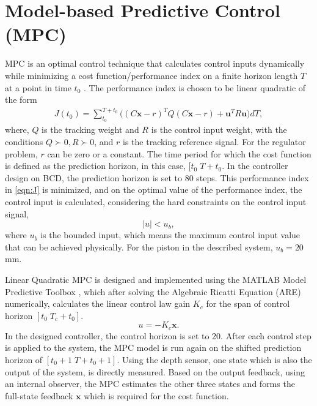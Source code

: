 \documentclass[conference, letterpaper]{IEEEtran}
\begin{document}
\section{Model-based Predictive Control (MPC)}
MPC is an optimal control technique that calculates control inputs dynamically while minimizing a cost function/performance index on a finite horizon length $T$ at a point in time $t_0$ \cite{Rawlings}. The performance index is chosen to be linear quadratic of the form
\begin{equation}
    \begin{aligned}
        J(t_0)= \sum_{t_0}^{T+t_0}{{((C\mathbf{x}-r)}^TQ(C\mathbf{x}-r)+\mathbf{u}^TR\mathbf{u})dT},
    \end{aligned}
    \label{eqn:J}
\end{equation}
where, $Q$ is the tracking weight and $R$ is the control input weight, with the conditions  $ Q\succ0, R\succ0$, and $r$ is the tracking reference signal. For the regulator problem, $r$ can be zero or a constant. The time period for which the cost function is defined as the prediction horizon, in this case, $[t_0 \; T+t_0$. In the controller design on BCD, the prediction horizon is set to 80 steps. This performance index in \ref{eqn:J} is minimized, and on the optimal value of the performance index, the control input is calculated, considering the hard constraints on the control input signal,
\begin{equation}
    |u| < u_b,
\end{equation}
where $u_b$ is the bounded input, which means the maximum control input value that can be achieved physically. For the piston in the described system, $u_b = 20$ mm.

Linear Quadratic MPC is designed and implemented using the MATLAB Model Predictive Toolbox \cite{mathworks_MPC}, which after solving the Algebraic Ricatti Equation (ARE) numerically, calculates the linear control law gain $K_c$ for the span of control horizon $[t_0 \; T_c+t_0]$.
\begin{equation}
    u=-K_c\mathbf{x}.
\end{equation}
In the designed controller, the control horizon is set to 20. After each control step is applied to the system, the MPC model is run again on the shifted prediction horizon of $[t_0+1 \; T+t_0+1]$.
Using the depth sensor, one state which is also the output of the system, is directly measured. Based on the output feedback, using an internal observer, the MPC estimates the other three states and forms the full-state feedback $\mathbf{x}$ which is required for the cost function.
\end{document}
